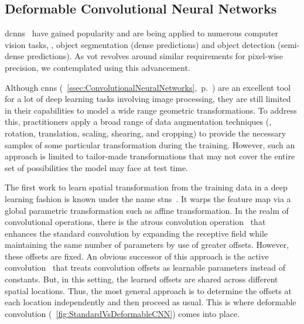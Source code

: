 \subsection{Deformable Convolutional Neural Networks}
\label{ssec:DeformableCNNs}

\glspl{dcnn}~\cite{dai2017dcnn} have gained popularity and are being applied to numerous computer vision tasks, \egtext{}, object segmentation (dense predictions) and object detection (semi-dense predictions). As \gls{vot} revolves around similar requirements for pixel-wise precision, we contemplated using this advancement.

Although \glspl{cnn} (\sectiontext{}~\ref{ssec:ConvolutionalNeuralNetworks},~p.~\pageref{ssec:ConvolutionalNeuralNetworks}) are an excellent tool for a lot of deep learning tasks involving image processing, they are still limited in their capabilities to model a wide range geometric transformations. To address this, practitioners apply a broad range of data augmentation techniques (\egtext{}, rotation, translation, scaling, shearing, and cropping) to provide the necessary samples of some particular transformation during the training. However, such an approach is limited to tailor-made transformations that may not cover the entire set of possibilities the model may face at test time.

The first work to learn spatial transformation from the training data in a deep learning fashion is known under the name \glspl{stn}~\cite{jaderberg2016stn}. It warps the feature map via a global parametric transformation such as affine transformation. In the realm of convolutional operations, there is the atrous convolution operation~\cite{holschneider1990atrousconv} that enhances the standard convolution by expanding the receptive field while maintaining the same number of parameters by use of greater offsets. However, these offsets are fixed. An obvious successor of this approach is the active convolution~\cite{jeon2017activeconv} that treats convolution offsets as learnable parameters instead of constants. But, in this setting, the learned offsets are shared across different spatial locations. Thus, the most general approach is to determine the offsets at each location independently and then proceed as usual. This is where deformable convolution (\figtext{}~\ref{fig:StandardVsDeformableCNN}) comes into place.

